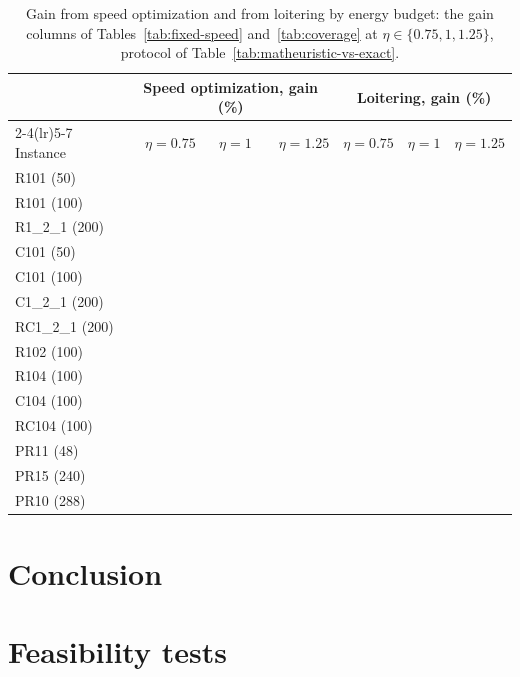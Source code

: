 \documentclass[11pt]{article}
\begin{document}
\begin{table}[H]
\centering\small
\setlength{\tabcolsep}{6pt}
\caption{Gain from speed optimization and from loitering by energy budget: the gain columns of Tables~\ref{tab:fixed-speed} and~\ref{tab:coverage} at $\eta \in \{0.75, 1, 1.25\}$, protocol of Table~\ref{tab:matheuristic-vs-exact}.}\label{tab:levers-eta}
\begin{tabular}{l rrr rrr}
\toprule
& \multicolumn{3}{c}{Speed optimization, gain (\%)} & \multicolumn{3}{c}{Loitering, gain (\%)} \\
\cmidrule(lr){2-4}\cmidrule(lr){5-7}
Instance & $\eta = 0.75$ & $\eta = 1$ & $\eta = 1.25$ & $\eta = 0.75$ & $\eta = 1$ & $\eta = 1.25$ \\
\midrule
R101 (50) & & & & & & \\
R101 (100) & & & & & & \\
R1\_2\_1 (200) & & & & & & \\
\midrule
C101 (50) & & & & & & \\
C101 (100) & & & & & & \\
C1\_2\_1 (200) & & & & & & \\
\midrule
RC1\_2\_1 (200) & & & & & & \\
\midrule
R102 (100) & & & & & & \\
R104 (100) & & & & & & \\
C104 (100) & & & & & & \\
RC104 (100) & & & & & & \\
\midrule
PR11 (48) & & & & & & \\
PR15 (240) & & & & & & \\
PR10 (288) & & & & & & \\
\bottomrule
\end{tabular}
\end{table}


\section{Conclusion} \label{sec:conc}


\appendix

\section{Feasibility tests}\label{app:feasibility}
\end{document}
